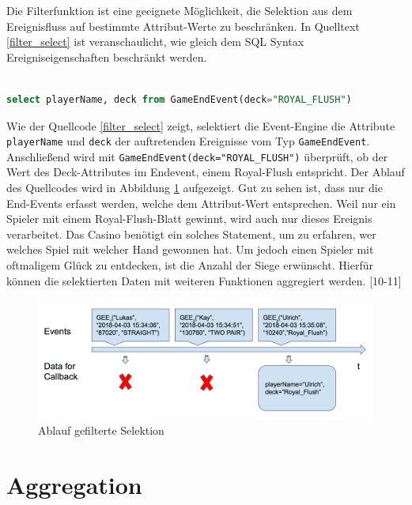 Die Filterfunktion ist eine geeignete Möglichkeit, die Selektion aus dem Ereignisfluss auf bestimmte Attribut-Werte zu beschränken. In Quelltext \ref{filter_select} ist veranschaulicht, wie gleich dem SQL Syntax Ereigniseigenschaften beschränkt werden.
\begin{lstlisting}[caption={Statement mit Filter},label=filter_select,captionpos=b,language=SQL]

select playerName, deck from GameEndEvent(deck="ROYAL_FLUSH")

\end{lstlisting}
Wie der Quellcode \ref{filter_select} zeigt, selektiert die Event-Engine die Attribute \texttt{playerName} und \texttt{deck} der auftretenden Ereignisse vom Typ \texttt{GameEndEvent}. Anschließend wird mit \texttt{GameEndEvent(deck="ROYAL\_FLUSH")} überprüft, ob der Wert des Deck-Attributes im Endevent, einem Royal-Flush entspricht.
\absatz
Der Ablauf des Quellcodes wird in Abbildung \ref{filter_select_img} aufgezeigt. Gut zu sehen ist, dass nur die End-Events erfasst werden, welche dem Attribut-Wert entsprechen. Weil nur ein Spieler mit einem Royal-Flush-Blatt gewinnt, wird auch nur dieses Ereignis verarbeitet.
Das Casino benötigt ein solches Statement, um zu erfahren, wer welches Spiel mit welcher Hand gewonnen hat. Um jedoch einen Spieler mit oftmaligem Glück zu entdecken, ist die Anzahl der Siege erwünscht. Hierfür können die selektierten Daten mit weiteren Funktionen aggregiert werden.
\cite{EsperRef2018}[10-11]

\begin{figure}[ht]
	\centering
	\includegraphics[width=\textwidth,height=\textheight, keepaspectratio]{images/statement_basic_filter.png}
	\caption{Ablauf gefilterte Selektion}
	\label{filter_select_img}
\end{figure}

\section{Aggregation}

